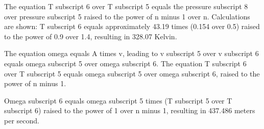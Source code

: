 The equation T subscript 6 over T subscript 5 equals the pressure subscript 8 over pressure subscript 5 raised to the power of n minus 1 over n. Calculations are shown: T subscript 6 equals approximately 43.19 times (0.154 over 0.5) raised to the power of 0.9 over 1.4, resulting in 328.07 Kelvin.

The equation omega equals A times v, leading to v subscript 5 over v subscript 6 equals omega subscript 5 over omega subscript 6. The equation T subscript 6 over T subscript 5 equals omega subscript 5 over omega subscript 6, raised to the power of n minus 1. 

Omega subscript 6 equals omega subscript 5 times (T subscript 5 over T subscript 6) raised to the power of 1 over n minus 1, resulting in 437.486 meters per second.